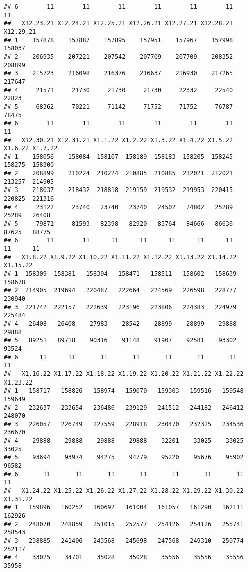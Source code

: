 \documentclass[
]{article}
\begin{document}
\begin{verbatim}
## 6        11        11        11        11        11        11        11
##   X12.23.21 X12.24.21 X12.25.21 X12.26.21 X12.27.21 X12.28.21 X12.29.21
## 1    157878    157887    157895    157951    157967    157998    158037
## 2    206935    207221    207542    207709    207709    208352    208899
## 3    215723    216098    216376    216637    216930    217265    217647
## 4     21571     21730     21730     21730     22332     22540     22823
## 5     68362     70221     71142     71752     71752     76787     78475
## 6        11        11        11        11        11        11        11
##   X12.30.21 X12.31.21 X1.1.22 X1.2.22 X1.3.22 X1.4.22 X1.5.22 X1.6.22 X1.7.22
## 1    158056    158084  158107  158189  158183  158205  158245  158275  158300
## 2    208899    210224  210224  210885  210885  212021  212021  213257  214905
## 3    218037    218432  218818  219159  219532  219953  220415  220825  221316
## 4     23122     23740   23740   23740   24502   24802   25289   25289   26408
## 5     79871     81593   82398   82920   83764   84666   86636   87625   88775
## 6        11        11      11      11      11      11      11      11      11
##   X1.8.22 X1.9.22 X1.10.22 X1.11.22 X1.12.22 X1.13.22 X1.14.22 X1.15.22
## 1  158309  158381   158394   158471   158511   158602   158639   158678
## 2  214905  219694   220487   222664   224569   226598   228777   230940
## 3  221742  222157   222639   223196   223806   224383   224979   225484
## 4   26408   26408    27983    28542    28899    28899    29888    29888
## 5   89251   89718    90316    91148    91907    92581    93302    93524
## 6      11      11       11       11       11       11       11       11
##   X1.16.22 X1.17.22 X1.18.22 X1.19.22 X1.20.22 X1.21.22 X1.22.22 X1.23.22
## 1   158717   158826   158974   159070   159303   159516   159548   159649
## 2   232637   233654   236486   239129   241512   244182   246412   248070
## 3   226057   226749   227559   228918   230470   232325   234536   236670
## 4    29888    29888    29888    29888    32201    33025    33025    33025
## 5    93694    93974    94275    94779    95220    95676    95902    96582
## 6       11       11       11       11       11       11       11       11
##   X1.24.22 X1.25.22 X1.26.22 X1.27.22 X1.28.22 X1.29.22 X1.30.22 X1.31.22
## 1   159896   160252   160692   161004   161057   161290   162111   162926
## 2   248070   248859   251015   252577   254126   254126   255741   258543
## 3   238885   241406   243568   245698   247568   249310   250774   252117
## 4    33025    34701    35028    35028    35556    35556    35556    35958

\end{verbatim}
\end{document}
